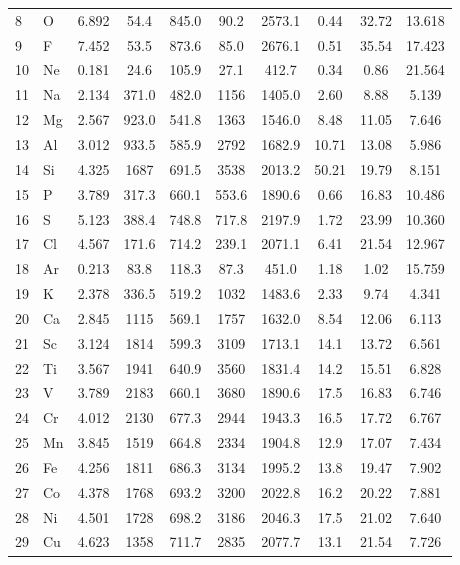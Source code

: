 \documentclass[11pt,a4paper]{article}
\begin{document}
\begin{english}
\begin{longtable}{@{}llcccccccc@{}}
			8  & O   & 6.892 & 54.4   & 845.0  & 90.2   & 2573.1 & 0.44  & 32.72 & 13.618 \\
			9  & F   & 7.452 & 53.5   & 873.6  & 85.0   & 2676.1 & 0.51  & 35.54 & 17.423 \\
			10 & Ne  & 0.181 & 24.6   & 105.9  & 27.1   & 412.7  & 0.34  & 0.86  & 21.564 \\
			11 & Na  & 2.134 & 371.0  & 482.0  & 1156   & 1405.0 & 2.60  & 8.88  & 5.139 \\
			12 & Mg  & 2.567 & 923.0  & 541.8  & 1363   & 1546.0 & 8.48  & 11.05 & 7.646 \\
			13 & Al  & 3.012 & 933.5  & 585.9  & 2792   & 1682.9 & 10.71 & 13.08 & 5.986 \\
			14 & Si  & 4.325 & 1687   & 691.5  & 3538   & 2013.2 & 50.21 & 19.79 & 8.151 \\
			15 & P   & 3.789 & 317.3  & 660.1  & 553.6  & 1890.6 & 0.66  & 16.83 & 10.486 \\
			16 & S   & 5.123 & 388.4  & 748.8  & 717.8  & 2197.9 & 1.72  & 23.99 & 10.360 \\
			17 & Cl  & 4.567 & 171.6  & 714.2  & 239.1  & 2071.1 & 6.41  & 21.54 & 12.967 \\
			18 & Ar  & 0.213 & 83.8   & 118.3  & 87.3   & 451.0  & 1.18  & 1.02  & 15.759 \\
			19 & K   & 2.378 & 336.5  & 519.2  & 1032   & 1483.6 & 2.33  & 9.74  & 4.341 \\
			20 & Ca  & 2.845 & 1115   & 569.1  & 1757   & 1632.0 & 8.54  & 12.06 & 6.113 \\
			21 & Sc  & 3.124 & 1814   & 599.3  & 3109   & 1713.1 & 14.1  & 13.72 & 6.561 \\
			22 & Ti  & 3.567 & 1941   & 640.9  & 3560   & 1831.4 & 14.2  & 15.51 & 6.828 \\
			23 & V   & 3.789 & 2183   & 660.1  & 3680   & 1890.6 & 17.5  & 16.83 & 6.746 \\
			24 & Cr  & 4.012 & 2130   & 677.3  & 2944   & 1943.3 & 16.5  & 17.72 & 6.767 \\
			25 & Mn  & 3.845 & 1519   & 664.8  & 2334   & 1904.8 & 12.9  & 17.07 & 7.434 \\
			26 & Fe  & 4.256 & 1811   & 686.3  & 3134   & 1995.2 & 13.8  & 19.47 & 7.902 \\
			27 & Co  & 4.378 & 1768   & 693.2  & 3200   & 2022.8 & 16.2  & 20.22 & 7.881 \\
			28 & Ni  & 4.501 & 1728   & 698.2  & 3186   & 2046.3 & 17.5  & 21.02 & 7.640 \\
			29 & Cu  & 4.623 & 1358   & 711.7  & 2835   & 2077.7 & 13.1  & 21.54 & 7.726 \\

\end{longtable}
\end{english}
\end{document}
